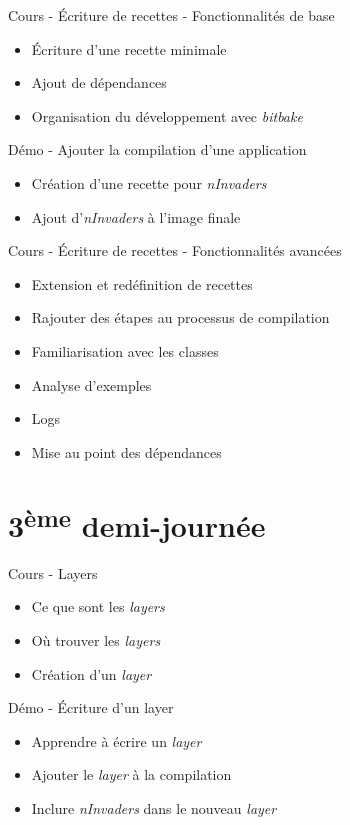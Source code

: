 \documentclass[a4paper,12pt,obeyspaces,spaces,hyphens]{article}
\begin{document}
\feagendatwocolumn
{Cours - Écriture de recettes - Fonctionnalités de base}
{
  \begin{itemize}
  \item Écriture d'une recette minimale
  \item Ajout de dépendances
  \item Organisation du développement avec {\em bitbake}
  \end{itemize}
}
{Démo - Ajouter la compilation d'une application}
{
  \begin{itemize}
  \item Création d'une recette pour {\em nInvaders}
  \item Ajout d'{\em nInvaders} à l'image finale
  \end{itemize}
}

\feagendaonecolumn
{Cours - Écriture de recettes - Fonctionnalités avancées}
{
  \begin{itemize}
  \item Extension et redéfinition de recettes
  \item Rajouter des étapes au processus de compilation
  \item Familiarisation avec les classes
  \item Analyse d'exemples
  \item Logs
  \item Mise au point des dépendances
  \end{itemize}
}

\section{3\textsuperscript{ème} demi-journée}

\feagendatwocolumn
{Cours - Layers}
{
  \begin{itemize}
  \item Ce que sont les {\em layers}
  \item Où trouver les {\em layers}
  \item Création d'un {\em layer}
  \end{itemize}
}
{Démo - Écriture d'un layer}
{
  \begin{itemize}
  \item Apprendre à écrire un {\em layer}
  \item Ajouter le {\em layer} à la compilation
  \item Inclure {\em nInvaders} dans le nouveau {\em layer}
  \end{itemize}
}
\end{document}
